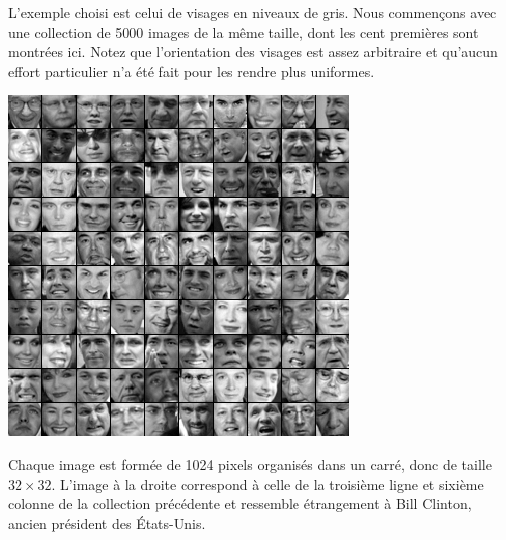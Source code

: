 \begin{adjmulticols}{1}{0in}{-2in}

\begin{center}
\begin{minipage}{0.9\textwidth}
L'exemple choisi est celui de visages en niveaux de gris.
Nous commençons avec une collection de 5000 images de la même taille,
dont les cent premières sont montrées ici.  Notez que l'orientation des visages
est assez arbitraire et qu'aucun effort particulier n'a été fait pour les rendre
plus uniformes.
\end{minipage}
\hfill
\begin{minipage}{0.45\textwidth}
\includegraphics[width=\linewidth]{./images/faces}
\end{minipage}
\end{center}

\begin{center}
\begin{minipage}{0.9\textwidth}
Chaque image est formée de 1024 pixels organisés dans un carré,
donc de taille $32\times 32$. L'image à la droite correspond
à celle de la troisième ligne et sixième colonne de la collection
précédente et ressemble étrangement à Bill Clinton, ancien
président des États-Unis.


\end{minipage}
\end{center}
\end{adjmulticols}

